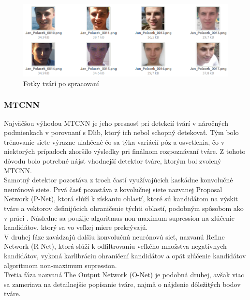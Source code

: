 \begin{figure}[H]
	\centering
	\includegraphics[width=1\linewidth]{img/dlib_aligned}
	\caption{Fotky tvárí po spracovaní}
	\label{fig:dlib_aligned}
\end{figure}


\subsubsection{MTCNN}
Najväčšou výhodou MTCNN je jeho presnosť pri detekcií tvárí v náročných podmienkach v porovnaní s Dlib, ktorý ich nebol schopný detekovať\cite{davidsan26}.
Tým bolo trénovanie siete výrazne uľahčené čo sa týka variácií póz a osvetlenia, čo v niektorých prípadoch zhoršilo výsledky pri finálnom rozpoznávaní tváre.
Z tohoto dôvodu bolo potrebné nájsť vhodnejší detektor tváre, ktorým bol zvolený MTCNN.\\

\indent Samotný detektor pozostáva z troch častí využívajúcich kaskádne konvolučné neurónové siete.
Prvá časť pozostáva z kovolučnej siete nazvanej Proposal Network (P-Net), ktorá slúží k získaniu  oblastí, ktoré sú kandidátom na výskit tváre a vektorov definijúcich ohraničenie týchti oblastí, podobným spôsobom ako v práci \cite{farfade2015multi}.
Následne sa použije algoritmus non-maximum supression na zlúčenie kandidátov, ktorý sa vo veľkej miere prekrývajú. \cite{mtcnn} \\

\indent V druhej fáze zavádzajú ďalšiu konvolučnú neurónovú sieť, nazvanú Refine Network (R-Net),
ktorá slúží k odfiltrovaniu veľkého množstva negatívnych kandidátov, vykoná karlibráciu ohraničení kandidátov a opät zlúčenie kandidátov algoritmom non-maximum supression. \cite{mtcnn} \\

\indent Tretia fáza nazvaná The Output Network (O-Net) je podobná druhej, avšak viac sa zameriava na detailnejšie popísanie tváre, najmä o nájdenie dôležitých bodov tváre.\cite{mtcnn} \\

